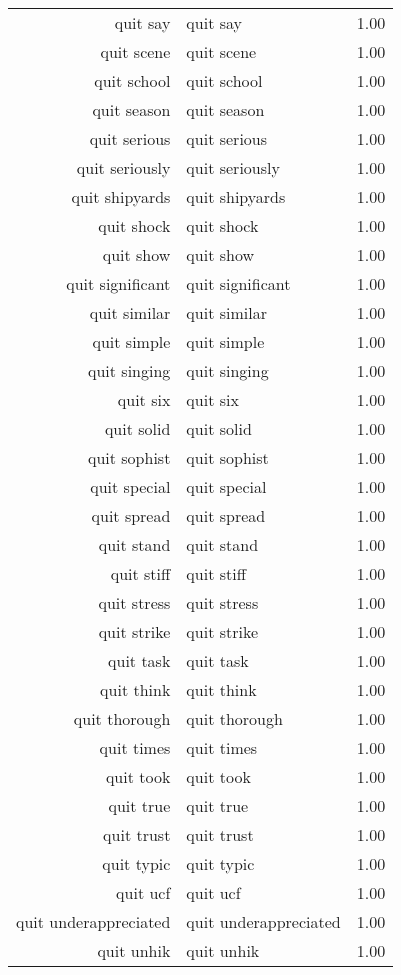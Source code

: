\begin{table}[ht]
\begin{tabular}{rlr}
  quit say & quit say & 1.00 \\ 
  quit scene & quit scene & 1.00 \\ 
  quit school & quit school & 1.00 \\ 
  quit season & quit season & 1.00 \\ 
  quit serious & quit serious & 1.00 \\ 
  quit seriously & quit seriously & 1.00 \\ 
  quit shipyards & quit shipyards & 1.00 \\ 
  quit shock & quit shock & 1.00 \\ 
  quit show & quit show & 1.00 \\ 
  quit significant & quit significant & 1.00 \\ 
  quit similar & quit similar & 1.00 \\ 
  quit simple & quit simple & 1.00 \\ 
  quit singing & quit singing & 1.00 \\ 
  quit six & quit six & 1.00 \\ 
  quit solid & quit solid & 1.00 \\ 
  quit sophist & quit sophist & 1.00 \\ 
  quit special & quit special & 1.00 \\ 
  quit spread & quit spread & 1.00 \\ 
  quit stand & quit stand & 1.00 \\ 
  quit stiff & quit stiff & 1.00 \\ 
  quit stress & quit stress & 1.00 \\ 
  quit strike & quit strike & 1.00 \\ 
  quit task & quit task & 1.00 \\ 
  quit think & quit think & 1.00 \\ 
  quit thorough & quit thorough & 1.00 \\ 
  quit times & quit times & 1.00 \\ 
  quit took & quit took & 1.00 \\ 
  quit true & quit true & 1.00 \\ 
  quit trust & quit trust & 1.00 \\ 
  quit typic & quit typic & 1.00 \\ 
  quit ucf & quit ucf & 1.00 \\ 
  quit underappreciated & quit underappreciated & 1.00 \\ 
  quit unhik & quit unhik & 1.00 \\ 

\end{tabular}
\end{table}
